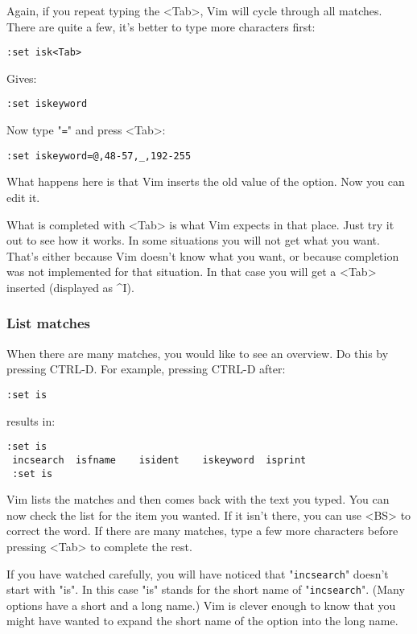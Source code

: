 Again, if you repeat typing the <Tab>, Vim will cycle through all matches.
There are quite a few, it's better to type more characters first:

\begin{Verbatim}[samepage=true]
 :set isk<Tab>
\end{Verbatim}

Gives:

\begin{Verbatim}[samepage=true]
 :set iskeyword
\end{Verbatim}

Now type "\texttt{=}" and press <Tab>:

\begin{Verbatim}[samepage=true]
 :set iskeyword=@,48-57,_,192-255
\end{Verbatim}

What happens here is that Vim inserts the old value of the option.
Now you can edit it.

What is completed with <Tab> is what Vim expects in that place.
Just try it out to see how it works.
In some situations you will not get what you want.
That's either because Vim doesn't know what you want, or because completion was not implemented for that situation.
In that case you will get a <Tab> inserted (displayed as \textasciicircum I).
\subsubsection{List matches}
When there are many matches, you would like to see an overview.
Do this by pressing CTRL-D.
For example, pressing CTRL-D after:

\begin{Verbatim}[samepage=true]
 :set is
\end{Verbatim}

results in:

\begin{Verbatim}[samepage=true]
 :set is
 incsearch  isfname    isident    iskeyword  isprint
 :set is
\end{Verbatim}

Vim lists the matches and then comes back with the text you typed.
You can now check the list for the item you wanted.
If it isn't there, you can use <BS> to correct the word.
If there are many matches, type a few more characters before pressing <Tab> to complete the rest.

If you have watched carefully, you will have noticed that "\texttt{incsearch}" doesn't start with "is".
In this case "is" stands for the short name of "\texttt{incsearch}".
(Many options have a short and a long name.)  Vim is clever enough to know that you might have wanted to expand the short name of the option into the long name.
